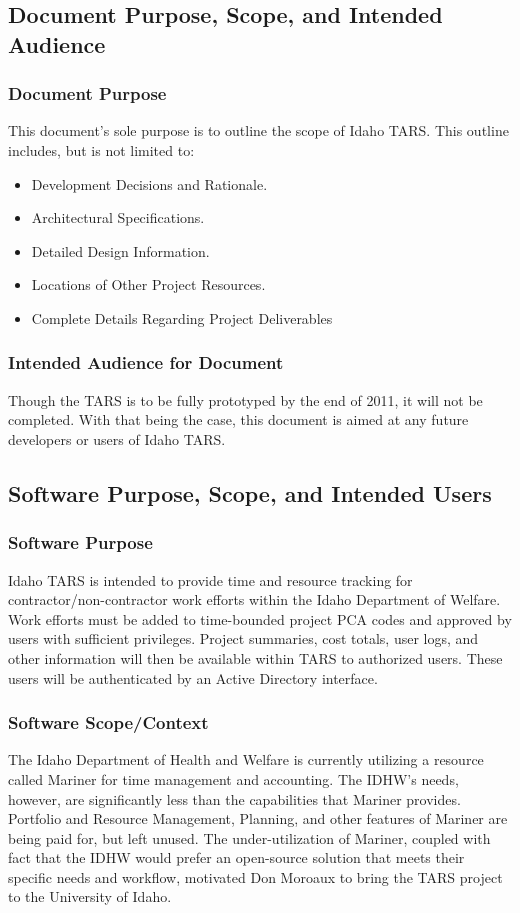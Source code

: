 \documentclass[letterpaper]{article}
\begin{document}
\subsection{\bfseries{Document Purpose, Scope, and Intended Audience}}
\subsubsection{Document Purpose}
This document's sole purpose is to outline the scope of Idaho TARS. This outline includes, but is not limited to:
\begin{itemize}
\item Development Decisions and Rationale.
\item Architectural Specifications.
\item Detailed Design Information.
\item Locations of Other Project Resources.
\item Complete Details Regarding Project Deliverables
\end{itemize}
\subsubsection{Intended Audience for Document}
Though the TARS is to be fully prototyped by the end of 2011, it will not be completed. With that being the case, this document is aimed at any future developers or users of Idaho TARS. 

\subsection{\bfseries{Software Purpose, Scope, and Intended Users}}
\subsubsection{Software Purpose}
Idaho TARS is intended to provide time and resource tracking for contractor/non-contractor work efforts within the Idaho Department of Welfare. Work efforts must be added to time-bounded project PCA codes and approved by users with sufficient privileges. Project summaries, cost totals, user logs, and other information will then be available within TARS to authorized users. These users will be authenticated by an Active Directory interface.     

\subsubsection{Software Scope/Context}
The Idaho Department of Health and Welfare is currently utilizing a resource called Mariner for time management and accounting. The IDHW's needs, however, are significantly less than the capabilities that Mariner provides. Portfolio and Resource Management, Planning, and other features of Mariner are being paid for, but left unused. The under-utilization of Mariner, coupled with fact that the IDHW would prefer an open-source solution that meets their specific needs and workflow, motivated Don Moroaux to bring the TARS project to the University of Idaho. 
\end{document}
